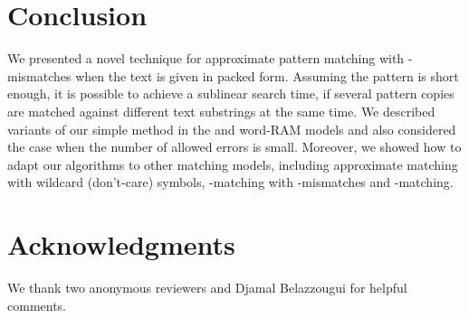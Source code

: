 \documentclass{llncs}
\begin{document}
\section{Conclusion}
\noindent
We presented a novel technique for approximate pattern matching with
-mismatches when the text is given in packed form. Assuming the
pattern is short enough, it is possible to achieve a sublinear search
time, if several pattern copies are matched against different text
substrings at the same time. We described variants of our simple
method in the  and word-RAM models and also considered the case
when the number  of allowed errors is small. Moreover, we showed
how to adapt our algorithms to other matching models, including
approximate matching with wildcard (don't-care) symbols,
-matching with -mismatches and -matching.

\section{Acknowledgments}

We thank two anonymous reviewers and Djamal Belazzougui for helpful comments.



\end{document}

